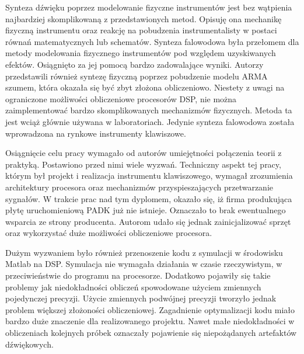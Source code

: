 Synteza dźwięku poprzez modelowanie fizyczne instrumentów jest bez wątpienia najbardziej skomplikowaną z przedstawionych metod. Opisuję ona mechanikę fizyczną instrumentu oraz reakcję na pobudzenia instrumentalisty w postaci równań matematycznych lub schematów. Synteza falowodowa była przełomem dla metody modelowania fizycznego instrumentów pod względem uzyskiwanych efektów. Osiągnięto za jej pomocą bardzo zadowalające wyniki. Autorzy przedstawili również syntezę fizyczną poprzez pobudzenie modelu ARMA szumem, która okazała się być zbyt złożona obliczeniowo.
Niestety z uwagi na ograniczone możliwości obliczeniowe procesorów DSP, nie można zaimplementować bardzo skomplikowanych mechanizmów fizycznych. Metoda ta jest wciąż głównie używana w laboratoriach. Jedynie synteza falowodowa została wprowadzona na rynkowe instrumenty klawiszowe.

Osiągnięcie celu pracy wymagało od autorów umiejętności połączenia teorii z praktyką. Postawiono przed nimi wiele wyzwań. Techniczny aspekt tej pracy, którym był projekt i realizacja instrumentu klawiszowego, wymagał zrozumienia architektury procesora oraz mechanizmów przyspieszających przetwarzanie sygnałów. 
W trakcie prac nad tym dyplomem, okazało się, iż firma produkująca płytę uruchomieniową PADK już nie istnieje. Oznaczało to brak ewentualnego wsparcia ze strony producenta. Autorom udało się jednak zainicjalizować sprzęt oraz wykorzystać duże możliwości obliczeniowe procesora.

Dużym wyzwaniem było również przenoszenie kodu z symulacji w środowisku Matlab na DSP. Symulacja nie wymagała działania w czasie rzeczywistym, w przeciwieństwie do programu na procesorze. Dodatkowo pojawiły się takie problemy jak niedokładności obliczeń spowodowane użyciem zmiennych pojedynczej precyzji. Użycie zmiennych podwójnej precyzji tworzyło jednak problem większej złożoności obliczeniowej. Zagadnienie optymalizacji kodu miało bardzo duże znaczenie dla realizowanego projektu. Nawet małe niedokładności w obliczeniach kolejnych próbek oznaczały pojawienie się niepożądanych artefaktów dźwiękowych.


